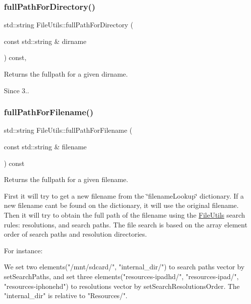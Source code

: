\subsubsection{\texorpdfstring{full\+Path\+For\+Directory()}{fullPathForDirectory()}}
{\footnotesize\ttfamily std\+::string File\+Utils\+::full\+Path\+For\+Directory (\begin{DoxyParamCaption}\item[{const std\+::string \&}]{dirname }\end{DoxyParamCaption}) const\hspace{0.3cm}{\ttfamily [protected]}, {\ttfamily [virtual]}}

Returns the fullpath for a given dirname. \begin{DoxySince}{Since}
3.. 
\end{DoxySince}
\mbox{\label{classFileUtils_a678409294ab5f13195b109e503f6a1df}} 
\subsubsection{\texorpdfstring{full\+Path\+For\+Filename()}{fullPathForFilename()}\hspace{0.1cm}{\footnotesize\ttfamily [1/2]}}
{\footnotesize\ttfamily std\+::string File\+Utils\+::full\+Path\+For\+Filename (\begin{DoxyParamCaption}\item[{const std\+::string \&}]{filename }\end{DoxyParamCaption}) const\hspace{0.3cm}{\ttfamily [virtual]}}

Returns the fullpath for a given filename.

First it will try to get a new filename from the \char`\"{}filename\+Lookup\char`\"{} dictionary. If a new filename can\textquotesingle{}t be found on the dictionary, it will use the original filename. Then it will try to obtain the full path of the filename using the \hyperlink{classFileUtils}{File\+Utils} search rules\+: resolutions, and search paths. The file search is based on the array element order of search paths and resolution directories.

For instance\+: \begin{DoxyVerb}We set two elements("/mnt/sdcard/", "internal_dir/") to search paths vector by setSearchPaths,
and set three elements("resources-ipadhd/", "resources-ipad/", "resources-iphonehd")
to resolutions vector by setSearchResolutionsOrder. The "internal_dir" is relative to "Resources/".
\end{DoxyVerb}


